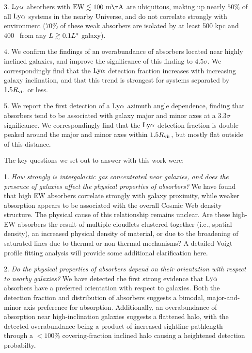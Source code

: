 3. $\rm Ly\alpha$ absorbers with $\rm EW \lesssim 100~m\AA$ are ubiquitous, making up nearly $50\%$ of all $\rm Ly\alpha$ systems in the nearby Universe, and do not correlate strongly with environment ($70\%$ of these weak absorbers are isolated by at least 500 kpc and 400 \kms~from any $L \gtrsim0.1 L^{\**}$ galaxy). 

4. We confirm the \cite{french2017} findings of an overabundance of absorbers located near highly inclined galaxies, and improve the significance of this finding to $4.5\sigma$. We correspondingly find that the $\rm Ly\alpha$ detection fraction increases with increasing galaxy inclination, and that this trend is strongest for systems separated by $1.5 R_{\rm vir}$ or less.

5. We report the first detection of a $\rm Ly\alpha$ azimuth angle dependence, finding that absorbers tend to be associated with galaxy major and minor axes at a $3.3\sigma$ significance. We correspondingly find that the $\rm Ly\alpha$ detection fraction is double peaked around the major and minor axes within $1.5 R_{\rm vir}$, but mostly flat outside of this distance.


The key questions we set out to answer with this work were:

1. \emph{How strongly is intergalactic gas concentrated near galaxies, and does the presence of galaxies affect the physical properties of absorbers?}
We have found that high EW absorbers correlate strongly with galaxy proximity, while weaker absorption appears to be associated with the overall Cosmic Web density structure. The physical cause of this relationship remains unclear. Are these high-EW absorbers the result of multiple cloudlets clustered together (i.e., spatial density), an increased physical density of material, or due to the broadening of saturated lines due to thermal or non-thermal mechanisms? A detailed Voigt profile fitting analysis will provide some additional clarification here.

\vspace{10pt}

2. \emph{Do the physical properties of absorbers depend on their orientation with respect to nearby galaxies?}
We have detected the first strong evidence that $\rm Ly\alpha$ absorbers have a preferred orientation with respect to galaxies.  Both the detection fraction and distribution of absorbers suggests a bimodal, major-and-minor axis preference for absorption. Additionally, an overabundance of absorption near high-inclination galaxies suggests a flattened halo, with the detected overabundance being a product of increased sightline pathlength through a $<100\%$ covering-fraction inclined halo causing a heightened detection probabilty.

